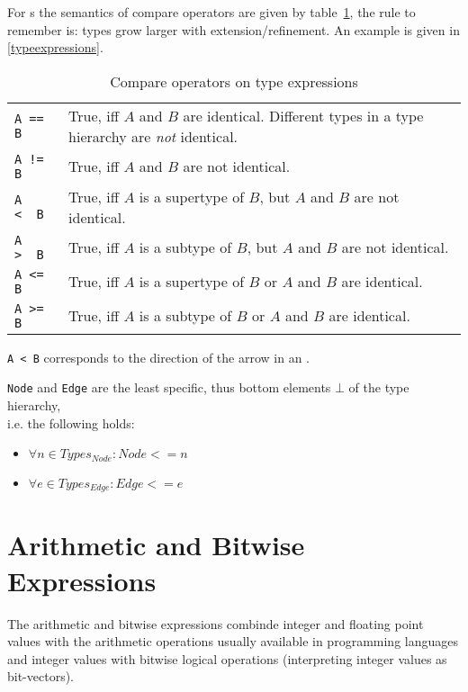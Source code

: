 For s the semantics of compare operators are given by table~\ref{compandtypes},
the rule to remember is: types grow larger with extension/refinement. An example is given in \ref{typeexpressions}.
\begin{table}[htbp]
  \centering
  \begin{tabularx}{\linewidth}{|l|X|} \hline
    \texttt{A == B} & True, iff $A$ and $B$ are identical. Different types in a type hierarchy are \emph{not} identical. \\
    \texttt{A != B} & True, iff $A$ and $B$ are not identical. \\
    \texttt{A <\ \ B} & True, iff $A$ is a supertype of $B$, but $A$ and $B$ are not identical. \\
    \texttt{A >\ \ B} & True, iff $A$ is a subtype of $B$, but $A$ and $B$ are not identical. \\
    \texttt{A <= B} & True, iff $A$ is a supertype of $B$ or $A$ and $B$ are identical. \\
    \texttt{A >= B} & True, iff $A$ is a subtype of $B$ or $A$ and $B$ are identical. \\ \hline
  \end{tabularx}
  \caption{Compare operators on type expressions}
  \label{compandtypes}
\end{table}
\begin{note}
  \texttt{A < B} corresponds to the direction of the arrow in an .
\end{note}
\begin{note}
  \texttt{Node} and \texttt{Edge} are the least specific, thus bottom elements $\bot$ of the type hierarchy,\\
  i.e. the following holds:
  \begin{itemize}
    \item $\forall n\in Types_{Node}: Node <= n$
    \item $\forall e\in Types_{Edge}: Edge <= e$
  \end{itemize}
\end{note}


\section{Arithmetic and Bitwise Expressions}

The arithmetic and bitwise expressions combinde integer and floating point values with the arithmetic operations usually available in programming languages
and integer values with bitwise logical operations (interpreting integer values as bit-vectors).

